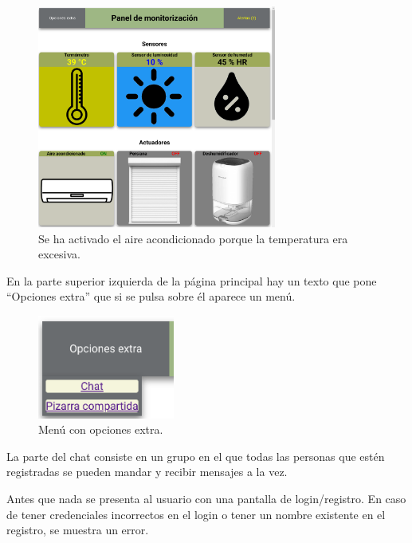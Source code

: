 \documentclass{article}
\begin{document}
\begin{figure}[H]
    \centering
    \includegraphics[width=0.7\textwidth]{images/sim.png}
    \caption{Se ha activado el aire acondicionado porque la temperatura era excesiva.}
\end{figure}

En la parte superior izquierda de la página principal hay un texto que pone ``Opciones extra'' que si se pulsa sobre él aparece un menú.

\begin{figure}[H]
    \centering
    \includegraphics[width=0.4\textwidth]{images/extra.png}
    \caption{Menú con opciones extra.}
\end{figure}

La parte del chat consiste en un grupo en el que todas las personas que estén registradas se pueden mandar y recibir mensajes a la vez.

\newpage

Antes que nada se presenta al usuario con una pantalla de login/registro. En caso de tener credenciales incorrectos en el login o tener un nombre existente en el registro, se muestra un error.
\end{document}
